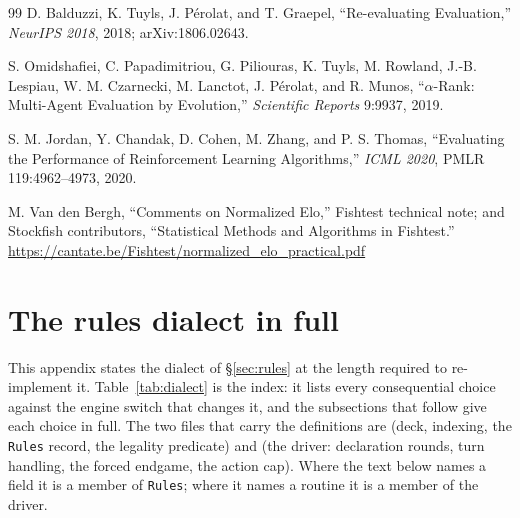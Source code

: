 \documentclass[11pt]{article}
\theoremstyle{definition}
\begin{document}
\begin{thebibliography}{99}
D. Balduzzi, K. Tuyls, J. P\'erolat, and T. Graepel, ``Re-evaluating
Evaluation,'' \emph{NeurIPS 2018}, 2018; arXiv:1806.02643.

S. Omidshafiei, C. Papadimitriou, G. Piliouras, K. Tuyls, M. Rowland,
J.-B. Lespiau, W. M. Czarnecki, M. Lanctot, J. P\'erolat, and R. Munos,
``$\alpha$-Rank: Multi-Agent Evaluation by Evolution,'' \emph{Scientific
Reports} 9:9937, 2019.

S. M. Jordan, Y. Chandak, D. Cohen, M. Zhang, and P. S. Thomas, ``Evaluating the
Performance of Reinforcement Learning Algorithms,'' \emph{ICML 2020},
PMLR 119:4962--4973, 2020.

M. Van den Bergh, ``Comments on Normalized Elo,'' Fishtest technical note; and
Stockfish contributors, ``Statistical Methods and Algorithms in Fishtest.''\\
\url{https://cantate.be/Fishtest/normalized_elo_practical.pdf}

\end{thebibliography}

\appendix
\section{The rules dialect in full}
\label{app:dialect}

This appendix states the dialect of \S\ref{sec:rules} at the length required to
re-implement it. Table~\ref{tab:dialect} is the index: it lists every
consequential choice against the engine switch that changes it, and the
subsections that follow give each choice in full. The two files that carry the
definitions are  (deck, indexing, the
\texttt{Rules} record, the legality predicate) and 
(the driver: declaration rounds, turn handling, the forced endgame, the action
cap). Where the text below names a field it is a member of \texttt{Rules}; where
it names a routine it is a member of the driver.
\end{document}
